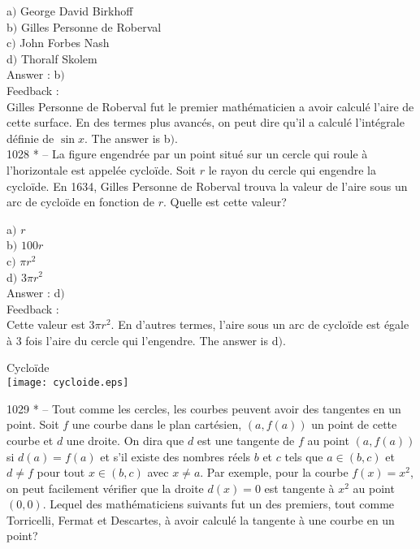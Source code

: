 ﻿\documentclass[letterpaper, 12pt]{article}
\begin{document}
a$)$ George David Birkhoff  \\
b$)$ Gilles Personne de Roberval \\
c$)$ John Forbes Nash  \\
d$)$ Thoralf Skolem\\

Answer : b$)$\\

Feedback :\\
Gilles Personne de Roberval fut le premier math\'ematicien a avoir
calcul\'e l'aire de cette surface. En des termes plus avanc\'es, on
peut dire qu'il a calcul\'e l'int\'egrale d\'efinie de $\sin x$.
The answer is b$)$.\\

1028 * -- La figure engendr\'ee par un point situ\'e sur un cercle
qui roule \`a l'horizontale est appel\'ee cyclo\"ide. Soit $r$ le
rayon du cercle qui engendre la cyclo\"ide. En 1634, Gilles Personne
de Roberval trouva la valeur de l'aire sous un arc de cyclo\"ide en
fonction de $r$. Quelle est cette valeur?

a$)$ $r$  \\
b$)$ $100r$ \\
c$)$ $\pi r^2$  \\
d$)$ $3\pi r^2$ \\

Answer : d$)$\\

Feedback :\\
Cette valeur est $3\pi r^2$. En d'autres termes, l'aire sous un arc
de cyclo\"ide est \'egale \`a 3 fois l'aire du cercle qui
l'engendre.
The answer is d$)$.\\

        \begin{center}
Cyclo\"ide        \\
    \texttt{[image: cycloide.eps]}\\
    \end{center}

1029 * -- Tout comme les cercles, les courbes peuvent avoir des
tangentes en un point. Soit $f$ une courbe dans le plan cart\'esien,
$(a,f(a))$ un point de cette courbe et $d$ une droite. On dira que
$d$ est une tangente de $f$ au point $(a,f(a))$ si $d(a)=f(a)$ et
s'il existe des nombres r\'eels $b$ et $c$ tels que $a\in(b,c)$ et
$d\not=f$ pour tout $x\in(b,c)$ avec $x\not=a$. Par exemple, pour la
courbe $f(x)=x^2$, on peut facilement v\'erifier que la droite
$d(x)=0$ est tangente \`a $x^2$ au point $(0,0)$. Lequel des
math\'ematiciens suivants fut un des premiers, tout comme
Torricelli, Fermat et Descartes, \`a avoir calcul\'e la tangente \`a
une courbe en un point?
\end{document}
